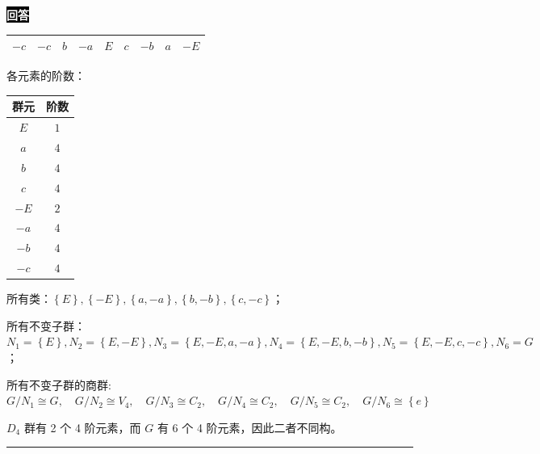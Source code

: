 \documentclass[11pt,a4paper]{ctexart}
\newenvironment{answer}
  {\par\smallskip\noindent
   \begingroup
   \setlength{\fboxsep}{4pt}%
   \colorbox{black}{\textcolor{white}{\bfseries 回答}}%
   \endgroup
   \quad\ignorespaces}
  {\par\smallskip\noindent\rule{\linewidth}{0.4pt}\medskip}
\begin{document}
\begin{answer}
\begin{center}
\begin{tabular}{c|*{8}{c}}
      $-c$
      & $-c$ & $b$ & $-a$ & $E$
      & $c$ & $-b$ & $a$ & $-E$ \\ \hline
    \end{tabular}
  \end{center}
  各元素的阶数：
  \begin{center}
    \begin{tabular}{c|c}
      群元 &阶数 \\ \hline
      $E $ &$1 $ \\
      $a $ &$4 $ \\
      $b $ &$4 $ \\
      $c $ &$4 $ \\
      $-E $ &$2 $ \\
      $-a $ &$4 $ \\
      $-b $ &$4 $ \\
      $-c $ &$4 $ \\ \hline
    \end{tabular}
  \end{center}

  所有类：$\left\{E \right\},\left\{-E \right\},\left\{a,-a \right\},\left\{b,-b \right\},\left\{c,-c \right\} $；

  所有不变子群：$N_1=\left\{E \right\},N_2=\left\{E,-E \right\},N_3=\left\{E,-E,a,-a \right\},N_4=\left\{E,-E,b,-b \right\},N_5=\left\{E,-E,c,-c \right\},N_6=G $；

  所有不变子群的商群:$G/N_1\cong G,\quad G/N_2\cong V_4,\quad G/N_3\cong C_2,\quad G/N_4\cong C_2,\quad G/N_5\cong C_2,\quad G/N_6\cong \left\{e \right\} $

  $D_4 $ 群有 2 个 4 阶元素，而 $G $ 有 6 个 4 阶元素，因此二者不同构。
\end{answer}
\end{document}
